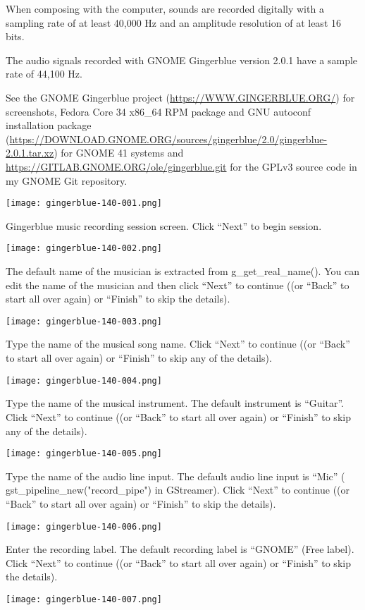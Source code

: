 \documentclass[UKenglish]{ifimaster}  %
\begin{document}
When composing with the computer, sounds are recorded digitally with a
sampling rate of at least 40,000 Hz and an amplitude resolution of at
least 16 bits.

The audio signals recorded with GNOME Gingerblue version 2.0.1 have a
sample rate of 44,100 Hz.

See the GNOME Gingerblue project (\url{https://WWW.GINGERBLUE.ORG/})
for screenshots, Fedora Core 34 x86\_64 RPM package and GNU autoconf
installation package
(\url{https://DOWNLOAD.GNOME.ORG/sources/gingerblue/2.0/gingerblue-2.0.1.tar.xz})
for GNOME 41 systems and
\url{https://GITLAB.GNOME.ORG/ole/gingerblue.git} for the GPLv3 source
code in my GNOME Git repository.

{\texttt{[image: gingerblue-140-001.png]}}

Gingerblue music recording session screen. Click “Next” to begin session.

{\texttt{[image: gingerblue-140-002.png]}}

The default name of the musician is extracted from g\_get\_real\_name(). You can edit the name of the musician and then click “Next” to continue ((or “Back” to start all over again) or “Finish” to skip the details).

{\texttt{[image: gingerblue-140-003.png]}}

Type the name of the musical song name. Click “Next” to continue ((or “Back” to start all over again) or “Finish” to skip any of the details).

{\texttt{[image: gingerblue-140-004.png]}}

Type the name of the musical instrument. The default instrument is “Guitar”. Click “Next” to continue ((or “Back” to start all over again) or “Finish” to skip any of the details).

{\texttt{[image: gingerblue-140-005.png]}}

Type the name of the audio line input. The default audio line input is “Mic” ( gst\_pipeline\_new("record\_pipe") in GStreamer). Click “Next” to continue ((or “Back” to start all over again) or “Finish” to skip the details).

{\texttt{[image: gingerblue-140-006.png]}}

Enter the recording label. The default recording label is “GNOME” (Free label). Click “Next” to continue ((or “Back” to start all over again) or “Finish” to skip the details).

{\texttt{[image: gingerblue-140-007.png]}}
\end{document}
